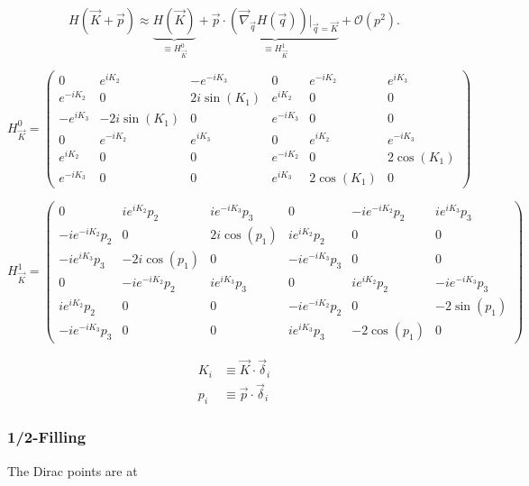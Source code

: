 \documentclass[../../../main.tex]{subfiles}
\begin{document}
\begin{equation}
	H(\vec{K}+ \vec{p}) \approx \underbrace{H(\vec{K})}_{\equiv H_{\vec{K}}^0} + \underbrace{\vec{p} \cdot \left(\vec{\nabla}_{\vec{q}}H(\vec{q})\right)\bigg\rvert_{\vec{q} = \vec{K}}}_{\equiv H_{\vec{K}}^1} + \mathcal{O}(p^2).
\end{equation}

\begin{equation}
	H_{\vec{K}}^0 =
	\begin{pmatrix}
		0 & e^{iK_2} & -e^{-iK_3} & 0 & e^{-iK_2} & e^{iK_3} \\
		e^{-iK_2} & 0 & 2i\sin(K_1) & e^{iK_2} & 0 & 0 \\
		-e^{iK_3} & -2i\sin(K_1) & 0 & e^{-iK_3} & 0 & 0 \\
		0 & e^{-iK_2} & e^{iK_3} & 0 & e^{iK_2} & e^{-iK_3}\\
		e^{iK_2} & 0 & 0 & e^{-iK_2} & 0 & 2\cos(K_1) \\
		e^{-iK_3} & 0 & 0 & e^{iK_3} & 2\cos(K_1) & 0
	\end{pmatrix} 
\end{equation}

\begin{equation}
	H_{\vec{K}}^1 =
	\begin{pmatrix}
		0 & ie^{iK_2}p_2 & ie^{-iK_3}p_3 & 0 & -ie^{-iK_2}p_2 & ie^{iK_3}p_3 \\
		-ie^{-iK_2}p_2 & 0 & 2i\cos(p_1) & ie^{iK_2}p_2 & 0 & 0 \\
		-ie^{iK_3}p_3 & -2i\cos(p_1) & 0 & -ie^{-iK_3}p_3 & 0 & 0 \\
		0 & -ie^{-iK_2}p_2 & ie^{iK_3}p_3 & 0 & ie^{iK_2}p_2 & -ie^{-iK_3}p_3\\
		ie^{iK_2}p_2 & 0 & 0 & -ie^{-iK_2}p_2 & 0 & -2\sin(p_1) \\
		-ie^{-iK_3}p_3 & 0 & 0 & ie^{iK_3}p_3 & -2\cos(p_1) & 0
	\end{pmatrix} 
\end{equation}

\begin{align*} 
	K_i &\equiv \vec{K}\cdot\vec{\delta}_i \\
	p_i &\equiv \vec{p}\cdot\vec{\delta}_i
\end{align*}

\subsubsection{1/2-Filling}

The Dirac points are at 
\end{document}
